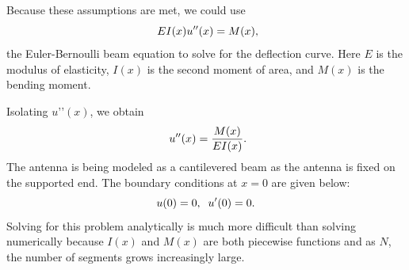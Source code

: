 \documentclass[12pt]{article}
\begin{document}
Because these assumptions are met, we could use
\begin{equation}
    \centering
    \ EI(x)u''(x) = M(x),
\end{equation}
the Euler-Bernoulli beam equation to solve for the deflection curve. Here $E$ is the modulus of elasticity, $I(x)$ is the second moment of area, and $M(x)$ is the bending moment.

Isolating $u’’(x)$, we obtain 
\begin{equation}\label{eq:Deflection}
    \centering
    \ u''(x) = \frac{M(x)}{EI(x)}.
\end{equation}
The antenna is being modeled as a cantilevered beam as the antenna is fixed on the supported end. The boundary conditions at $x = 0$ are given below:
\begin{equation}
    \centering
    u(0) = 0,\; \;u'(0) = 0.
\end{equation}
Solving for this problem analytically is much more difficult than solving numerically because $I(x)$ and $M(x)$ are both piecewise functions and as $N$, the number of segments grows increasingly large.
\end{document}
